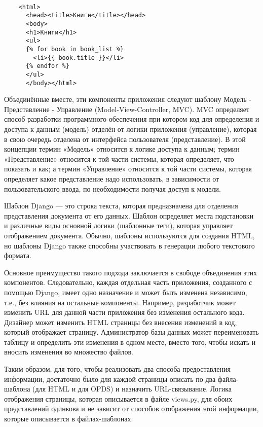 \documentclass[a4paper]{report}
\begin{document}
{
    \small \begin{verbatim}	

    <html>
      <head><title>Книги</title></head>
      <body>
      <h1>Книги</h1>
      <ul>
      {% for book in book_list %}
        <li>{{ book.title }}</li>
      {% endfor %}
      </ul>
      </body></html>
\end{verbatim}	
}


 Объединённые вместе, эти компоненты приложения следуют шаблону Модель - Представление - Управление  (Model-View-Controller, MVC). MVC определяет способ разработки программного обеспечения при котором код для определения и доступа к данным (модель) отделён от логики приложения (управление), которая в свою очередь отделена от интерфейса пользователя (представление). В этой концепции термин «Модель» относится к логике доступа к данным; термин «Представление» относится к той части системы, которая определяет, что показать и как; а термин «Управление» относится к той части системы, которая определяет какое представление надо использовать, в зависимости от пользовательского ввода, по необходимости получая доступ к модели. 

Шаблон Django — это строка текста, которая предназначена для отделения представления документа от его данных. Шаблон определяет места подстановки и различные виды основной логики (шаблонные теги), которая управляет отображением документа. Обычно, шаблоны используются для создания HTML, но шаблоны Django также способны участвовать в генерации любого текстового формата.

Основное преимущество такого подхода заключается в свободе объединения этих компонентов. Следовательно, каждая отдельная часть приложения, созданного с помощью Django, имеет одно назначение и может быть изменена независимо, т.е., без влияния на остальные компоненты. Например, разработчик может изменить URL для данной части приложения без изменения остального кода. Дизайнер может изменить HTML страницы без внесения изменений в код, который отображает страницу. Администратор базы данных может переименовать таблицу и определить эти изменения в одном месте, вместо того, чтобы искать и вносить изменения во множество файлов.

Таким образом, для того, чтобы реализовать два способа предоставления информации, достаточно было для каждой страницы описать по два файла-шаблона (для HTML и для OPDS) и назначить URL-связывание. Логика отображения страницы, которая описывается в файле views.py, для обоих представлений одинкова и не зависит от способов отображения этой информации, которые описывается в файлах-шаблонах.
\end{document}

